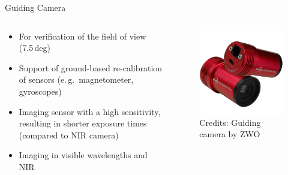 \documentclass[11pt, aspectratio=169]{beamer}
\begin{document}
\begin{frame}{Guiding Camera}
\begin{columns}[t]
\begin{column}{0.6\textwidth}
\begin{itemize}
	\item For verification of the field of view (7.5\,deg)
	\item Support of ground-based re-calibration of sensors (e.\,g.~magnetometer, gyroscopes)
	\item Imaging sensor with a high sensitivity, resulting in shorter exposure times (compared to NIR camera)
	\item Imaging in visible wavelengths and NIR
\end{itemize}

\end{column}
\begin{column}{0.4\textwidth}
	\begin{figure}[t]
		\centering
		\includegraphics[width=0.7\linewidth]{figures/images/ZWO_ASI290MM_Mini.jpg}
		\caption*{Credits: Guiding camera by ZWO}
		\label{fig::guiding_camera}
	\end{figure}
\end{column}
\end{columns}
\end{frame}

\end{document}
